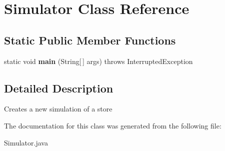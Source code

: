 \hypertarget{class_simulator}{}\section{Simulator Class Reference}
\label{class_simulator}
\subsection*{Static Public Member Functions}
\begin{DoxyCompactItemize}
\item 
\hypertarget{class_simulator_adbf6cf4f887eeff984a12e3c62456ff6}{}static void {\bfseries main} (String\mbox{[}$\,$\mbox{]} args)  throws Interrupted\+Exception\label{class_simulator_adbf6cf4f887eeff984a12e3c62456ff6}

\end{DoxyCompactItemize}


\subsection{Detailed Description}
Creates a new simulation of a store 

The documentation for this class was generated from the following file\+:\begin{DoxyCompactItemize}
\item 
Simulator.\+java\end{DoxyCompactItemize}
